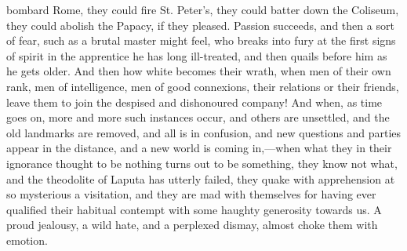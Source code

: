 bombard Rome, they could fire St. Peter's, they could
batter down the Coliseum, they could abolish the Papacy,
if they pleased. Passion succeeds, and then a sort of
fear, such as a brutal master might feel, who breaks into
fury at the first signs of spirit in the apprentice he
has long ill-treated, and then quails before him as he
gets older. And then how white becomes their wrath, when
men of their own rank, men of intelligence, men of good
connexions, their relations or their friends, leave them
to join the despised and dishonoured company! And when,
as time goes on, more and more such instances occur, and
others are unsettled, and the old landmarks are removed,
and all is in confusion, and new questions and parties
appear in the distance, and a new world is coming
in,—when what they in their ignorance thought to be
nothing turns out to be something, they know not what,
and the theodolite of Laputa has utterly failed, they
quake with apprehension at so mysterious a visitation,
and they are mad with themselves for having ever
qualified their habitual contempt with some haughty
generosity towards us. A proud jealousy, a wild hate, and
a perplexed dismay, almost choke them with emotion.

